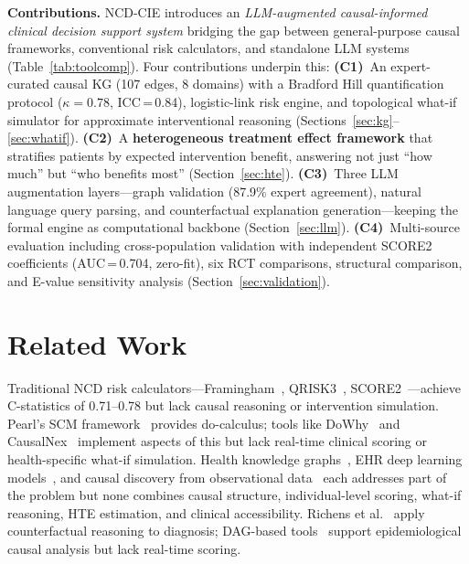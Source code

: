 \documentclass[runningheads]{llncs}
\begin{document}
\noindent\textbf{Contributions.}
NCD-CIE introduces an \emph{LLM-augmented causal-informed clinical
decision support system} bridging the gap between general-purpose causal
frameworks, conventional risk calculators, and standalone LLM systems
(Table~\ref{tab:toolcomp}).
Four contributions underpin this:
\textbf{(C1)}~An expert-curated causal KG (107 edges, 8 domains)
with a Bradford Hill quantification protocol ($\kappa=0.78$,
ICC\,=\,0.84), logistic-link risk engine, and topological what-if
simulator for approximate interventional reasoning
(Sections~\ref{sec:kg}--\ref{sec:whatif}).
\textbf{(C2)}~A \textbf{heterogeneous treatment effect framework}
that stratifies patients by expected intervention benefit, answering
not just ``how much'' but ``who benefits most''
(Section~\ref{sec:hte}).
\textbf{(C3)}~Three LLM augmentation layers---graph validation
(87.9\% expert agreement), natural language query parsing, and
counterfactual explanation generation---keeping the formal engine
as computational backbone (Section~\ref{sec:llm}).
\textbf{(C4)}~Multi-source evaluation including cross-population
validation with independent SCORE2 coefficients
(AUC\,=\,0.704, zero-fit), six RCT comparisons,
structural comparison, and E-value sensitivity analysis
(Section~\ref{sec:validation}).

\section{Related Work}\label{sec:related}

Traditional NCD risk calculators---Framingham~\cite{dagostino2008},
QRISK3~\cite{hippisley2017qrisk3}, SCORE2~\cite{score22021}---achieve
C-statistics of 0.71--0.78 but lack causal reasoning or intervention
simulation.
Pearl's SCM framework~\cite{pearl2009causality,hernan2020causal}
provides do-calculus; tools like DoWhy~\cite{sharma2020dowhy} and
CausalNex~\cite{beaumont2021causalnex} implement aspects of this but
lack real-time clinical scoring or health-specific what-if simulation.
Health knowledge graphs~\cite{chandak2023primekg,barabasi2011network},
EHR deep learning models~\cite{li2020behrt,rasmy2021medbert}, and
causal discovery from observational data~\cite{prosperi2020causal}
each addresses part of the problem but none combines causal structure,
individual-level scoring, what-if reasoning, HTE estimation, and clinical
accessibility.
Richens et al.~\cite{richens2020causal} apply counterfactual
reasoning to diagnosis; DAG-based tools~\cite{textor2016dagitty}
support epidemiological causal analysis but lack real-time scoring.
\end{document}
